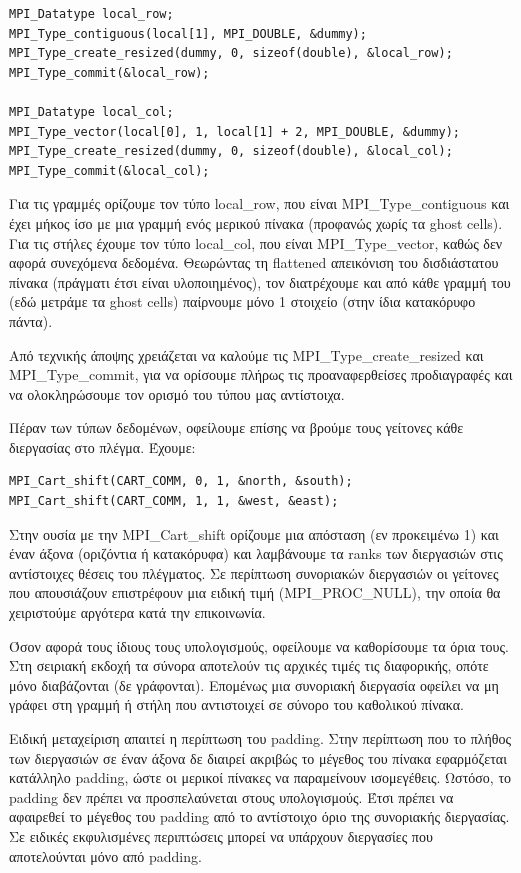 \documentclass[12pt,titlepage]{article}
\begin{document}
\begin{verbatim}
MPI_Datatype local_row;
MPI_Type_contiguous(local[1], MPI_DOUBLE, &dummy);
MPI_Type_create_resized(dummy, 0, sizeof(double), &local_row);
MPI_Type_commit(&local_row);

MPI_Datatype local_col;
MPI_Type_vector(local[0], 1, local[1] + 2, MPI_DOUBLE, &dummy);
MPI_Type_create_resized(dummy, 0, sizeof(double), &local_col);
MPI_Type_commit(&local_col);
\end{verbatim}

Για τις γραμμές ορίζουμε τον τύπο local\_row, που είναι MPI\_Type\_contiguous και
έχει μήκος ίσο με μια γραμμή ενός μερικού πίνακα (προφανώς χωρίς τα ghost
cells). Για τις στήλες έχουμε τον τύπο local\_col, που είναι MPI\_Type\_vector,
καθώς δεν αφορά συνεχόμενα δεδομένα. Θεωρώντας τη flattened απεικόνιση του
δισδιάστατου πίνακα (πράγματι έτσι είναι υλοποιημένος), τον διατρέχουμε και από
κάθε γραμμή του (εδώ μετράμε τα ghost cells) παίρνουμε μόνο 1 στοιχείο (στην
ίδια κατακόρυφο πάντα).

Από τεχνικής άποψης χρειάζεται να καλούμε τις MPI\_Type\_create\_resized και
MPI\_Type\_commit, για να ορίσουμε πλήρως τις προαναφερθείσες προδιαγραφές και
να ολοκληρώσουμε τον ορισμό του τύπου μας αντίστοιχα.

Πέραν των τύπων δεδομένων, οφείλουμε επίσης να βρούμε τους γείτονες κάθε
διεργασίας στο πλέγμα. Έχουμε:

\begin{verbatim}
MPI_Cart_shift(CART_COMM, 0, 1, &north, &south);
MPI_Cart_shift(CART_COMM, 1, 1, &west, &east);
\end{verbatim}

Στην ουσία με την MPI\_Cart\_shift ορίζουμε μια απόσταση (εν προκειμένω 1) και
έναν άξονα (οριζόντια ή κατακόρυφα) και λαμβάνουμε τα ranks των διεργασιών στις
αντίστοιχες θέσεις του πλέγματος. Σε περίπτωση συνοριακών διεργασιών οι γείτονες
που απουσιάζουν επιστρέφουν μια ειδική τιμή (MPI\_PROC\_NULL), την οποία θα
χειριστούμε αργότερα κατά την επικοινωνία.

Όσον αφορά τους ίδιους τους υπολογισμούς, οφείλουμε να καθορίσουμε τα όρια τους.
Στη σειριακή εκδοχή τα σύνορα αποτελούν τις αρχικές τιμές τις διαφορικής, οπότε
μόνο διαβάζονται (δε γράφονται). Επομένως μια συνοριακή διεργασία οφείλει να μη
γράφει στη γραμμή ή στήλη που αντιστοιχεί σε σύνορο του καθολικού πίνακα.

Ειδική μεταχείριση απαιτεί η περίπτωση του padding. Στην περίπτωση που το πλήθος
των διεργασιών σε έναν άξονα δε διαιρεί ακριβώς το μέγεθος του πίνακα
εφαρμόζεται κατάλληλο padding, ώστε οι μερικοί πίνακες να παραμείνουν
ισομεγέθεις. Ωστόσο, το padding δεν πρέπει να προσπελαύνεται στους υπολογισμούς.
Έτσι πρέπει να αφαιρεθεί το μέγεθος του padding από το αντίστοιχο όριο της
συνοριακής διεργασίας. Σε ειδικές εκφυλισμένες περιπτώσεις μπορεί να υπάρχουν
διεργασίες που αποτελούνται μόνο από padding.
\end{document}
